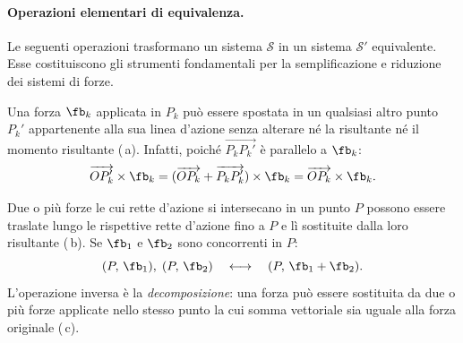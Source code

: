 


\paragraph{Operazioni elementari di equivalenza.}

Le seguenti operazioni trasformano un sistema $\mathcal{S}$ in
un sistema $\mathcal{S}'$ equivalente. Esse costituiscono gli
strumenti fondamentali per la semplificazione e riduzione dei
sistemi di forze.

\bigskip 
Una forza $\fb_k$ applicata in $P_k$ può essere spostata in un
qualsiasi altro punto $P_k'$ appartenente alla sua linea
d'azione senza alterare né la risultante né il momento
risultante (\,a). Infatti, poiché $\overrightarrow{P_k P_k'}$ è
parallelo a $\fb_k$:
\begin{equation}
	\overrightarrow{OP_k'} \times \fb_k
	= (\overrightarrow{OP_k}
	+ \overrightarrow{P_k P_k'}) \times \fb_k
	= \overrightarrow{OP_k} \times \fb_k.
\end{equation}

\bigskip

Due o più forze le cui rette d'azione si intersecano in un
punto $P$ possono essere traslate lungo le rispettive rette
d'azione fino a $P$ e lì sostituite dalla loro risultante (\,b). Se
$\fb_1$ e $\fb_2$ sono concorrenti in $P$:
\begin{equation}
	(P,\,\fb_1),\;(P,\,\fb_2)
	\quad\longleftrightarrow\quad
	(P,\,\fb_1+\fb_2).
\end{equation}
L'operazione inversa è la \textit{decomposizione}: una forza
può essere sostituita da due o più forze applicate nello stesso
punto la cui somma vettoriale sia uguale alla forza originale (\,c).





